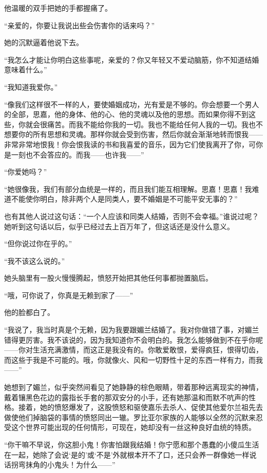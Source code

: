 \par 他温暖的双手把她的手都握痛了。
\par “亲爱的，你要让我说出些会伤害你的话来吗？”
\par 她的沉默逼着他说下去。
\par “我怎么才能让你明白这些事呢，亲爱的？你又年轻又不爱动脑筋，你不知道结婚意味着什么。”
\par “我知道我爱你。”
\par “像我们这样很不一样的人，要使婚姻成功，光有爱是不够的。你会想要一个男人的全部，思嘉，他的身体、他的心、他的灵魂以及他的思想。而如果你得不到这些，你就会很痛苦。而我不能给你我的一切。我也不能给任何人我的一切。我也不想要你的所有思想和灵魂。那样你就会受到伤害，然后你就会渐渐地转而恨我——非常非常地恨我！你会恨我读的书和我喜爱的音乐，因为它们使我离开了你，可你是一刻也不会答应的。而我——也许我——”
\par “你爱她吗？”
\par “她很像我，我们有部分血统是一样的，而且我们能互相理解。思嘉！思嘉！我难道不能使你明白，除非两个人是同类人，要不婚姻是不可能平安无事的？”
\par 也有其他人说过这句话：“一个人应该和同类人结婚，否则不会幸福。”谁说过呢？她听到这句话以后，似乎已经过去上百万年了，但这话还是没什么意义。
\par “但你说过你在乎的。”
\par “我不该这么说的。”
\par 她头脑里有一股火慢慢腾起，愤怒开始把其他任何事都抛置脑后。
\par “哦，可你说了，你真是无赖到家了——”
\par 他的脸都白了。
\par “我说了，我当时真是个无赖，因为我要跟媚兰结婚了。我对你做错了事，对媚兰错得更厉害。我不该说的，因为我知道你不会明白的。我怎么能够做到不在乎你呢——你对生活充满激情，而这正是我没有的。你敢爱敢恨，爱得疯狂，恨得切齿，而这些于我是不可能的。哦，你就像火、风和一切野性十足的东西一样有力，而我——”
\par 她想到了媚兰，似乎突然间看见了她静静的棕色眼睛，带着那种远离现实的神情，戴着镶黑色花边的露指长手套的那双安分的小手，还有她那温和而默不吭声的性格。接着，她的愤怒爆发了，这股愤怒和驱使嘉乐去杀人、促使其他爱尔兰祖先去做使他们掉脑袋的事情的愤怒同出一辙。罗比亚尔家族的人能够以全然的沉默来忍受这个世界可能出现的任何情形，可现在，她却没有一丝这种良好血统的特质。
\par “你干嘛不早说，你这胆小鬼！你害怕跟我结婚！你宁愿和那个愚蠢的小傻瓜生活在一起，她除了会说‘是的’或‘不是’外就根本开不了口，还只会养一群像她一样说话拐弯抹角的小鬼头！为什么——”
